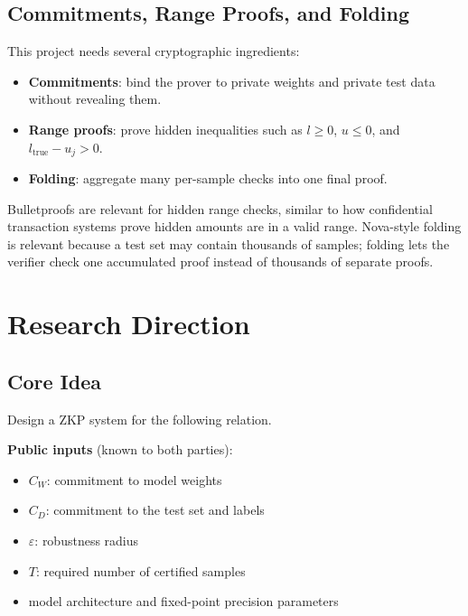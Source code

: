 \documentclass[11pt,a4paper]{article}
\begin{document}
\subsection{Commitments, Range Proofs, and Folding}

This project needs several cryptographic ingredients:
\begin{itemize}
    \item \textbf{Commitments}: bind the prover to private weights and private test data without revealing them.
    \item \textbf{Range proofs}: prove hidden inequalities such as $l \geq 0$, $u \leq 0$, and $l_{\text{true}} - u_j > 0$.
    \item \textbf{Folding}: aggregate many per-sample checks into one final proof.
\end{itemize}

Bulletproofs are relevant for hidden range checks, similar to how confidential transaction systems prove hidden amounts are in a valid range. Nova-style folding is relevant because a test set may contain thousands of samples; folding lets the verifier check one accumulated proof instead of thousands of separate proofs.

\section{Research Direction}

\subsection{Core Idea}

Design a ZKP system for the following relation.

\textbf{Public inputs} (known to both parties):
\begin{itemize}
    \item $C_W$: commitment to model weights
    \item $C_D$: commitment to the test set and labels
    \item $\varepsilon$: robustness radius
    \item $T$: required number of certified samples
    \item model architecture and fixed-point precision parameters
\end{itemize}
\end{document}
